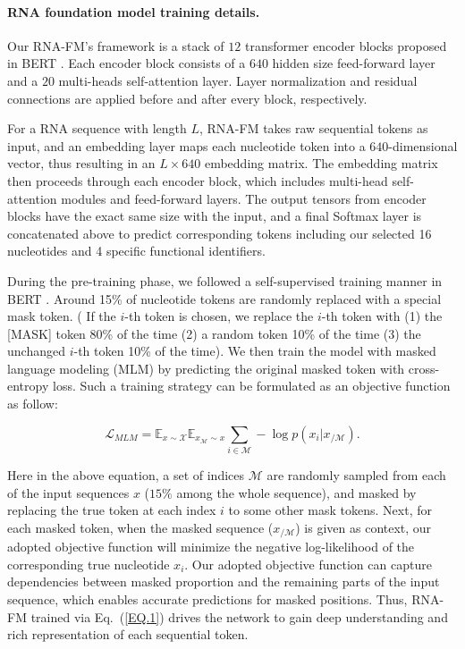 \paragraph{RNA foundation model training details.}

Our RNA-FM's framework is a stack of $12$ transformer encoder blocks proposed in BERT \cite{devlin2018bert}\cite{vaswani2017attention}. Each encoder block \cite{devlin2018bert} consists of a $640$ hidden size feed-forward layer and a $20$ multi-heads self-attention layer. Layer normalization \cite{devlin2018bert} and residual connections are applied before and after every block, respectively.


For a RNA sequence with length $L$, RNA-FM takes raw sequential tokens as input, and an embedding layer maps each nucleotide token into a $640$-dimensional vector, thus resulting in an $L\times 640$ embedding matrix. The embedding matrix then proceeds through each encoder block, which includes multi-head self-attention modules and feed-forward layers. The output tensors from encoder blocks have the exact same size with the input, and a final Softmax layer is concatenated above to predict corresponding tokens including our selected 16 nucleotides and 4 specific functional identifiers. 

During the pre-training phase, we followed a self-supervised training manner in BERT \cite{devlin2018bert}. Around 15\% of nucleotide tokens are randomly replaced with a special mask token. ( If the $i$-th token is chosen, we replace the $i$-th token with (1) the [MASK] token 80\% of the time (2) a random token 10\% of the time (3) the unchanged $i$-th token 10\% of the time). We then train the model with masked language modeling (MLM) \cite{devlin2018bert} by predicting the original masked token with cross-entropy loss. Such a training strategy can be formulated as an objective function as follow: 

\begin{equation}
\mathcal{L}_{MLM}= \mathbb{E}_{x \sim \mathcal{X}}\mathbb{E}_{x_{\mathcal{M}}\sim x}\sum_{i \in \mathcal{M}} - \log p(x_i|x_{/\mathcal{M}}).  \label{EQ.1}
\end{equation}

Here in the above equation, a set of indices $\mathcal{M}$ are randomly sampled from each of the input sequences $x$ ($15\%$ among the whole sequence), and masked by replacing the true token at each index $i$ to some other mask tokens.
Next, for each masked token, when the masked sequence ($x_{/\mathcal{M}}$) is given as context, our adopted objective function will minimize the negative log-likelihood of the corresponding true nucleotide $x_i$.
Our adopted objective function can capture dependencies between masked proportion and the remaining parts of the input sequence, which enables accurate predictions for masked positions. Thus, RNA-FM trained via Eq.~(\ref{EQ.1}) drives the network to gain deep understanding and rich representation of each sequential token.

